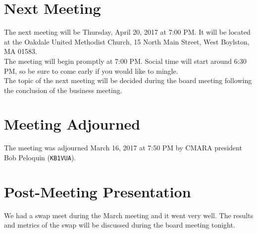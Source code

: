 \documentclass[10pt,letterpaper]{article}
\begin{document}
\section{Next Meeting}
The next meeting will be Thursday, April 20, 2017 at 7:00 PM. It will be located at the Oakdale United Methodist Church, 15 North Main Street, West Boylston, MA 01583.\\

\noindent
The meeting will begin promptly at 7:00 PM. Social time will start around 6:30 PM, so be sure to come early if you would like to mingle.\\

\noindent
The topic of the next meeting will be decided during the board meeting following the conclusion of the business meeting.

\section{Meeting Adjourned}
The meeting was adjourned March 16, 2017 at 7:50 PM by CMARA president Bob Peloquin (\texttt{KB1VUA}).

\section{Post-Meeting Presentation}

We had a swap meet during the March meeting and it went very well. The results and metrics of the swap will be discussed during the board meeting tonight.
\end{document}
